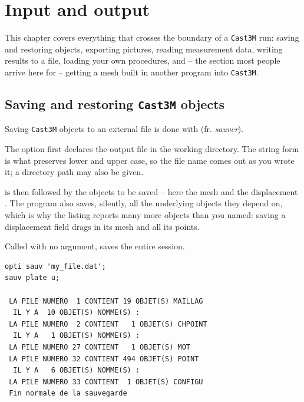 \chapter{Input and output}
\label{chap:importexport}


This chapter covers everything that crosses the boundary of a
\texttt{Cast3M} run: saving and restoring objects, exporting pictures,
reading measurement data, writing results to a file, loading your own
procedures, and -- the section most people arrive here for -- getting a mesh
built in another program into \texttt{Cast3M}.

\section{Saving and restoring \texttt{Cast3M} objects}

\begin{castemcom}
Saving \texttt{Cast3M} objects to an external file is done with
  (fr. \emph{sauver}).

The option first declares the output file in the working directory. The
string form is what preserves lower and upper case, so the file name comes
out as you wrote it; a directory path may also be given.

 is then followed by the objects to be saved -- here the mesh
 and the displacement . The program also saves, silently, all
the underlying objects they depend on, which is why the listing reports many
more objects than you named: saving a displacement field drags in its mesh
and all its points.

Called with no argument,  saves the entire session.
\end{castemcom}
\begin{castemlines}
\begin{verbatim}
opti sauv 'my_file.dat';
sauv plate u;

 LA PILE NUMERO  1 CONTIENT 19 OBJET(S) MAILLAG
  IL Y A  10 OBJET(S) NOMME(S) :
 LA PILE NUMERO  2 CONTIENT   1 OBJET(S) CHPOINT
  IL Y A   1 OBJET(S) NOMME(S) :
 LA PILE NUMERO 27 CONTIENT   1 OBJET(S) MOT
 LA PILE NUMERO 32 CONTIENT 494 OBJET(S) POINT
  IL Y A   6 OBJET(S) NOMME(S) :
 LA PILE NUMERO 33 CONTIENT  1 OBJET(S) CONFIGU
 Fin normale de la sauvegarde
\end{verbatim}
\end{castemlines}

